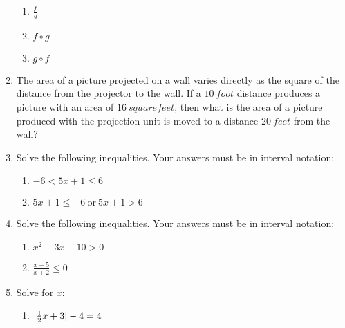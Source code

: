 \documentclass[letterpaper,12pt,fleqn]{article}
\begin{document}
\begin{enumerate}
\begin{enumerate}
  \item $\frac{f}{g}$

    \vspace{1in}
    
  \item $f\circ g$

    \vspace{1.5in}
    
  \item $g\circ f$

    \newpage
  \end{enumerate}

\item The area of a picture projected on a wall varies directly as the
  square of the distance from the projector to the wall. If a $\SI{10}{foot}$
  distance produces a picture with an area of $\SI{16}{square feet}$, then what
  is the area of a picture produced with the projection unit is moved to a
  distance $\SI{20}{feet}$ from the wall?

  \vspace{3in}

\item Solve the following inequalities. Your answers must be in interval
  notation:
  \begin{enumerate}
  \item $-6<5x+1\le6$

    \vspace{2in}
    
  \item $5x+1\le-6\ \mbox{or}\ 5x+1>6$

  \end{enumerate}

  \newpage
  
\item Solve the following inequalities. Your answers must be in interval
  notation:
  \begin{enumerate}
  \item $x^2-3x-10>0$

    \vspace{4in}
    
  \item $\frac{x-5}{x+2}\le0$

  \end{enumerate}

  \newpage

\item Solve for $x$:
  \begin{enumerate}
  \item $\lvert\frac{1}{2}x+3\rvert-4=4$


\end{enumerate}
\end{enumerate}
\end{document}
